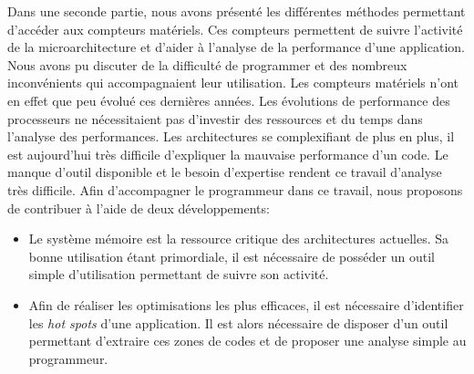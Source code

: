     
    Dans une seconde partie, nous avons présenté les différentes méthodes permettant d'accéder aux compteurs matériels. Ces compteurs permettent de suivre l'activité de la microarchitecture et d'aider à l'analyse de la performance d'une application. Nous avons pu discuter de la difficulté de programmer et des nombreux inconvénients qui accompagnaient leur utilisation. Les compteurs matériels n'ont en effet que peu évolué ces dernières années. Les évolutions de performance des processeurs ne nécessitaient pas d'investir des ressources et du temps dans l'analyse des performances. Les architectures se complexifiant de plus en plus, il est aujourd'hui très difficile d'expliquer la mauvaise performance d'un code. Le manque d'outil disponible et le besoin d'expertise rendent ce travail d'analyse très difficile. Afin d'accompagner le programmeur dans ce travail, nous proposons de contribuer à l'aide de deux développements:
    
    \begin{itemize}
        \item Le système mémoire est la ressource critique des architectures actuelles. Sa bonne utilisation étant primordiale, il est nécessaire de posséder un outil simple d'utilisation permettant de suivre son activité. 
        
        \item Afin de réaliser les optimisations les plus efficaces, il est nécessaire d'identifier les \textit{hot spots} d'une application. Il est alors nécessaire de disposer d'un outil permettant d'extraire ces zones de codes et de proposer une analyse simple au programmeur.
        
    \end{itemize}